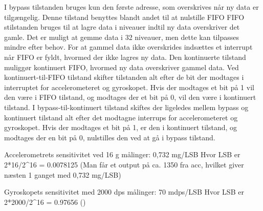 I bypass tilstanden bruges kun den første adresse, som overskrives når ny data er tilgængelig. Denne tilstand benyttes blandt andet til at nulstille FIFO
FIFO stilstanden bruges til at lagre data i niveauer indtil ny data overskriver det gamle. Det er muligt at gemme data i 32 niveauer, men dette kan tilpasses mindre efter behov. For at gammel data ikke overskrides indsættes et interrupt når FIFO er fyldt, hvormed der ikke lagres ny data. 
Den kontinuerte tilstand muliggør kontinuert FIFO, hvormed ny data overskriver gammel data. 
Ved kontinuert-til-FIFO tilstand skifter tilstanden alt efter de bit der modtages i interruptet for accelerometeret og gyroskopet. Hvis der modtages et bit på 1 vil den være i FIFO tilstand, og modtages der et bit på 0, vil den være i kontinuert tilstand. 
I bypass-til-kontinuert tilstand skiftes der ligeledes mellem bypass og kontinuert tilstand alt efter det modtagne interrups for accelerometeret og gyroskopet. Hvis der modtages et bit på 1, er den i kontinuert tilstand, og modtages der en bit på 0, nulstilles den ved at gå i bypass tilstand. 





Accelerometrets sensitivitet ved 16 g målinger: 0,732 mg/LSB
Hvor LSB er 2*16/2^16 = 0.0078125
(Man får et output på ca. 1350 fra acc, hvilket giver næsten 1 ganget med 0,732 mg/LSB)

Gyroskopets sensitivitet med 2000 dps målinger: 70 mdps/LSB
Hvor LSB er 2*2000/2^16 = 0.97656
()

